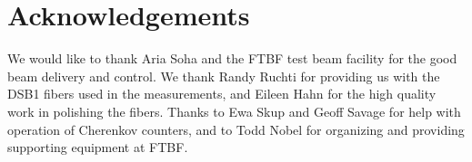 \documentclass[12pt]{article}
\begin{document}
\section{Acknowledgements}
We would like to thank Aria Soha and the FTBF test beam facility for the
good beam delivery and control. We thank Randy Ruchti for providing us
with the DSB1 fibers used in the measurements, and Eileen Hahn for the
high quality work in polishing the fibers. Thanks to Ewa Skup and Geoff
Savage for help with operation of Cherenkov counters, and to Todd Nobel
for organizing and providing supporting equipment at FTBF.


{}

\end{document}
